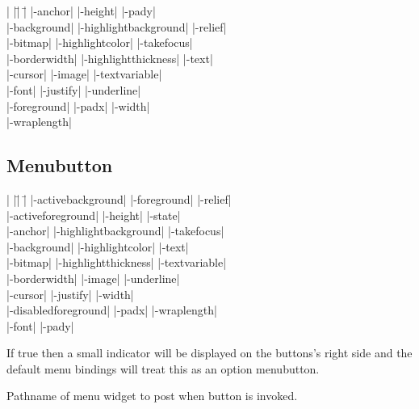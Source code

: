 \begin{tabbing}
|                   |\=|                     |\= \kill
|-anchor|           \> |-height|             \> |-pady| \\
|-background|       \> |-highlightbackground| \> |-relief| \\       
|-bitmap|           \> |-highlightcolor|     \> |-takefocus| \\
|-borderwidth|      \> |-highlightthickness| \> |-text| \\           
|-cursor|	    \> |-image|              \> |-textvariable| \\   
|-font|             \> |-justify|            \> |-underline| \\      
|-foreground|       \> |-padx|               \> |-width| \\          
		    \>			     \> |-wraplength| \\     
\end{tabbing}

\subsection*{Menubutton}
\vspace{-4pt}

\begin{tabbing}
|                    |\=|                    |\= \kill
|-activebackground| \> |-foreground|         \> |-relief| \\
|-activeforeground| \> |-height|             \> |-state| \\
|-anchor|           \> |-highlightbackground|\> |-takefocus| \\
|-background|       \> |-highlightcolor|     \> |-text| \\
|-bitmap|           \> |-highlightthickness| \> |-textvariable| \\
|-borderwidth|      \> |-image|              \> |-underline| \\
|-cursor|           \> |-justify|            \> |-width| \\
|-disabledforeground| \> |-padx| 	     \> |-wraplength| \\
|-font| 	    \> |-pady| \\
\end{tabbing}

\vskip5pt
\begin{enum}{1cm}

If true then a small indicator will be displayed on the buttons's
right side and the default menu bindings will treat this as an option
menubutton.

Pathname of menu widget to post when button is invoked.

\end{enum}

